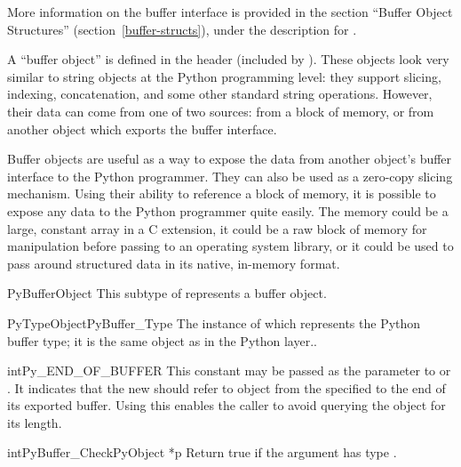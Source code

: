 More information on the buffer interface is provided in the section
``Buffer Object Structures'' (section~\ref{buffer-structs}), under
the description for .

A ``buffer object'' is defined in the  header
(included by ). These objects look very similar to
string objects at the Python programming level: they support slicing,
indexing, concatenation, and some other standard string
operations. However, their data can come from one of two sources: from
a block of memory, or from another object which exports the buffer
interface.

Buffer objects are useful as a way to expose the data from another
object's buffer interface to the Python programmer. They can also be
used as a zero-copy slicing mechanism. Using their ability to
reference a block of memory, it is possible to expose any data to the
Python programmer quite easily. The memory could be a large, constant
array in a C extension, it could be a raw block of memory for
manipulation before passing to an operating system library, or it
could be used to pass around structured data in its native, in-memory
format.

\begin{ctypedesc}{PyBufferObject}
  This subtype of  represents a buffer object.
\end{ctypedesc}

\begin{cvardesc}{PyTypeObject}{PyBuffer_Type}
  The instance of  which represents the Python
  buffer type; it is the same object as  in the
  Python layer..
\end{cvardesc}

\begin{cvardesc}{int}{Py_END_OF_BUFFER}
  This constant may be passed as the  parameter to
   or
  .  It indicates that the
  new  should refer to  object from
  the specified  to the end of its exported buffer.  Using
  this enables the caller to avoid querying the  object for
  its length.
\end{cvardesc}

\begin{cfuncdesc}{int}{PyBuffer_Check}{PyObject *p}
  Return true if the argument has type .
\end{cfuncdesc}

